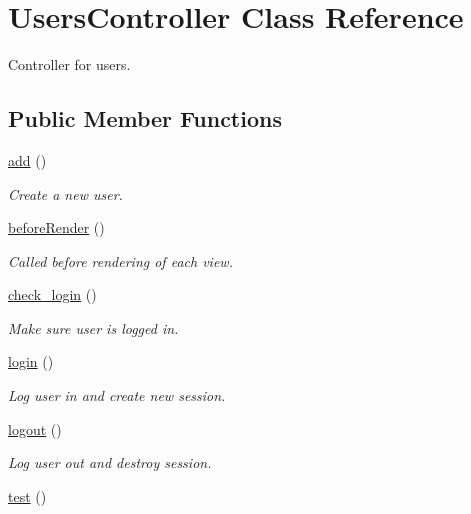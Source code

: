 \hypertarget{class_users_controller}{
\section{UsersController Class Reference}
\label{class_users_controller}
}


Controller for users.  


\subsection*{Public Member Functions}
\begin{DoxyCompactItemize}
\item 
\hyperlink{class_users_controller_a837ba24a1c3095ae67613238d866f79a}{add} ()
\begin{DoxyCompactList}\small\item\em Create a new user. \item\end{DoxyCompactList}\item 
\hyperlink{class_users_controller_ac89dd29d2229bbc37879d31f95d06e97}{beforeRender} ()
\begin{DoxyCompactList}\small\item\em Called before rendering of each view. \item\end{DoxyCompactList}\item 
\hyperlink{class_users_controller_a648185926782004aa207e8bdfdfe8197}{check\_\-login} ()
\begin{DoxyCompactList}\small\item\em Make sure user is logged in. \item\end{DoxyCompactList}\item 
\hyperlink{class_users_controller_aa311da27ba5706f5710cea7706c8eae1}{login} ()
\begin{DoxyCompactList}\small\item\em Log user in and create new session. \item\end{DoxyCompactList}\item 
\hyperlink{class_users_controller_a082405d89acd6835c3a7c7a08a7adbab}{logout} ()
\begin{DoxyCompactList}\small\item\em Log user out and destroy session. \item\end{DoxyCompactList}\item 
\hypertarget{class_users_controller_ad69dd4607977cae05ebe19d1ae604fb1}{
\hyperlink{class_users_controller_ad69dd4607977cae05ebe19d1ae604fb1}{test} ()}
\label{class_users_controller_ad69dd4607977cae05ebe19d1ae604fb1}


\end{DoxyCompactItemize}
